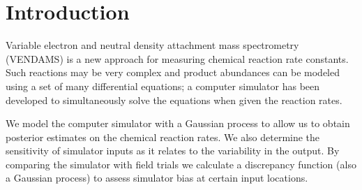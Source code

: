 \section{Introduction}

Variable electron and neutral density attachment mass spectrometry (VENDAMS) is a new approach for measuring chemical reaction rate constants. Such reactions may be very complex and product abundances can be modeled using a set of many differential equations; a computer simulator has been developed to simultaneously solve the equations when given the reaction rates. 

We model the computer simulator with a Gaussian process to allow us to obtain posterior estimates on the chemical reaction rates. We also determine the sensitivity of simulator inputs as it relates to the variability in the output. By comparing the simulator with field trials we calculate a discrepancy function (also a Gaussian process) to assess simulator bias at certain input locations.
